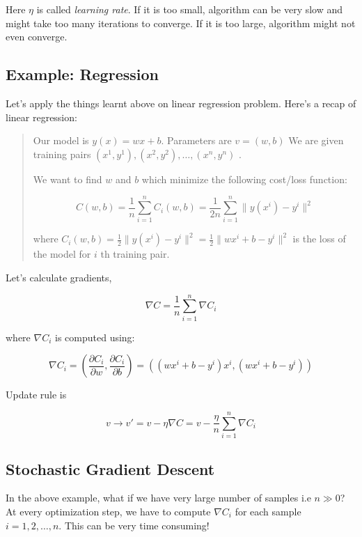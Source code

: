 \documentclass[a4paper]{tufte-handout}
\begin{document}
Here \(\eta\) is called \emph{learning rate}. If it is too small,
algorithm can be very slow and might take too many iterations to
converge. If it is too large, algorithm might not even converge.

\subsection{Example: Regression}\label{example-regression}

Let's apply the things learnt above on linear regression problem. Here's
a recap of linear regression:

\begin{quote}
Our model is \(y(x) = wx + b\). Parameters are \(v = (w, b)\) We are
given training pairs \((x^1, y^1), (x^2, y^2), \ldots, (x^n, y^n)\)
.

We want to find \(w\) and \(b\) which minimize the following cost/loss
function:

\[ C(w, b) = \frac{1}{n} \sum_{i = 1}^{n} C_i(w, b) = \frac{1}{2n} \sum_{i = 1}^{n} \| y(x^i) - y^i\|^2 \]

where
\(C_i(w, b) = \frac{1}{2} \| y(x^i) - y^i\|^2 = \frac{1}{2} \| wx^i + b - y^i\|^2\)
is the loss of the model for \(i\) th training pair.
\end{quote}


Let's calculate gradients,

\[ \nabla C = \frac{1}{n} \sum_{i = 1}^{n} \nabla C_i \]

where \(\nabla C_i\) is computed using:

\[ \nabla C_i = \left( \frac{\partial C_i}{\partial w}, \frac{\partial C_i}{\partial b}  \right) = \left( (wx^i + b - y^i)x^i, (wx^i + b - y^i) \right)\]

Update rule is

\[ v \rightarrow v' = v -\eta \nabla C = v -\frac{\eta}{n} \sum_{i = 1}^{n} \nabla C_i \]


\subsection{Stochastic Gradient Descent}\label{stochastic-gradient-descent}

In the above example, what if we have very large number of samples i.e
\(n \gg 0\)? At every optimization step, we have to compute
\(\nabla C_i\) for each sample \(i = 1, 2, \ldots, n\). This can be very
time consuming!
\end{document}
